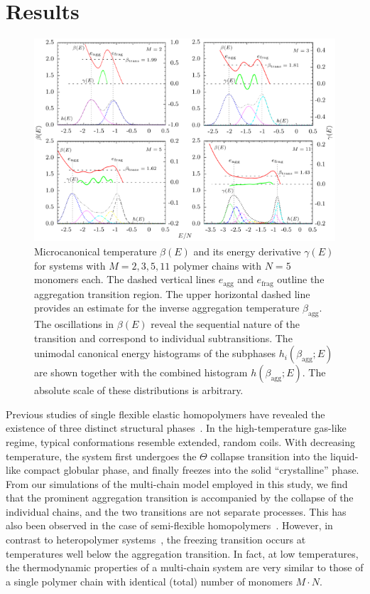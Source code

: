 \documentclass[12pt]{report}
\begin{document}
\section{Results}

%
\begin{figure}
\center
\includegraphics[width = 1.02\textwidth]{chapter7Figs/combinedMicro.eps}
\vspace{3mm}
\caption{\label{fig:agg_microSummary} Microcanonical temperature $\beta(E)$ and its energy derivative $\gamma(E)$ for systems with $M = 2,3,5,11$ polymer chains with $N=5$ monomers each. The dashed vertical lines $e_{\mathrm{agg}}$ and $e_{\mathrm{frag}}$ outline the aggregation transition region. The upper horizontal dashed line provides an estimate for the inverse aggregation temperature $\beta_{\mathrm{agg}}$. The oscillations in $\beta(E)$ reveal the sequential nature of the transition and correspond to individual subtransitions. The unimodal canonical energy histograms of the subphases $h_{i}(\beta_{\mathrm{agg}};E)$ are shown together with the combined histogram $h(\beta_{\mathrm{agg}};E)$. The absolute scale of these distributions is arbitrary.}
\end{figure}
%

Previous studies of single flexible elastic homopolymers have revealed the existence of three distinct structural phases~\cite{Schnabel2009,svbj1}. In the high-temperature gas-like regime, typical conformations resemble extended, random coils. With decreasing temperature, the system first undergoes the $\Theta$ collapse transition into the liquid-like compact globular phase, and finally freezes into the solid ``crystalline'' phase. From our simulations of the multi-chain model employed in this study, we find that the prominent aggregation transition is accompanied by the collapse of the individual chains, and the two transitions are not separate processes. This has also been observed in the case of semi-flexible homopolymers~\cite{Junghans2009}. However, in contrast to heteropolymer systems~\cite{Junghans2011}, the freezing transition occurs at temperatures well below the aggregation transition. In fact, at low temperatures, the thermodynamic properties of a multi-chain system are very similar to those of a single polymer chain with identical (total) number of monomers $M\cdot N$.
 
\end{document}

